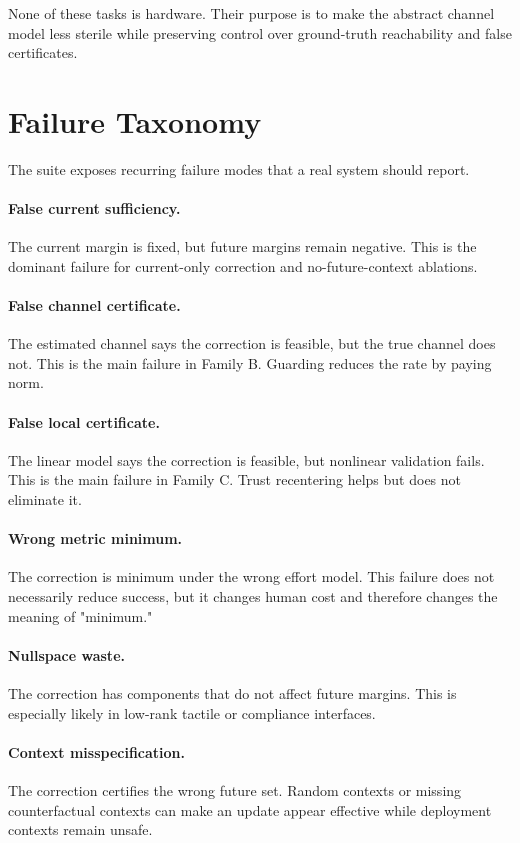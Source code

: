 \documentclass{article}
\begin{document}
None of these tasks is hardware. Their purpose is to make the abstract channel
model less sterile while preserving control over ground-truth reachability and
false certificates.

\section{Failure Taxonomy}

The suite exposes recurring failure modes that a real system should report.

\paragraph{False current sufficiency.}
The current margin is fixed, but future margins remain negative. This is the
dominant failure for current-only correction and no-future-context ablations.

\paragraph{False channel certificate.}
The estimated channel says the correction is feasible, but the true channel
does not. This is the main failure in Family B. Guarding reduces the rate by
paying norm.

\paragraph{False local certificate.}
The linear model says the correction is feasible, but nonlinear validation
fails. This is the main failure in Family C. Trust recentering helps but does
not eliminate it.

\paragraph{Wrong metric minimum.}
The correction is minimum under the wrong effort model. This failure does not
necessarily reduce success, but it changes human cost and therefore changes the
meaning of "minimum."

\paragraph{Nullspace waste.}
The correction has components that do not affect future margins. This is
especially likely in low-rank tactile or compliance interfaces.

\paragraph{Context misspecification.}
The correction certifies the wrong future set. Random contexts or missing
counterfactual contexts can make an update appear effective while deployment
contexts remain unsafe.
\end{document}
